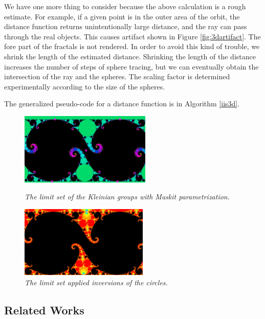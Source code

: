We have one more thing to consider because the above calculation is
a rough estimate.
For example, if a given point is in the outer area of the orbit, the
distance function returns unintentionally large distance, and the ray
can pass through the real objects. This causes artifact shown in Figure
\ref{fig:3dartifact}. The fore part of the fractals is not rendered.
In order to avoid this kind of trouble, we shrink the length of
the estimated distance.
Shrinking the length of the distance increases the number of steps of
sphere tracing, but we can
eventually obtain the intersection of the ray and the spheres.
The scaling factor is determined experimentally according to the size of
the spheres.

The generalized pseudo-code for a distance function is in Algorithm \ref{iis3d}. 

\begin{figure}[htbp]
 \begin{minipage}[t]{0.5\hsize}
  \center
  \includegraphics[height=1.35in, keepaspectratio]{img/preparation/related/josklein.png}
  \caption{\textit{The limit set of the Kleinian groups with Maskit parametrization.}}
  \label{fig:jos}
  \hspace*{\fill}
 \end{minipage}
 \begin{minipage}[t]{0.5\hsize}
  \center
  \includegraphics[height=1.35in, keepaspectratio]{img/preparation/related/joskleinInv.png}
  \caption{\textit{The limit set applied inversions of the circles.}}
  \label{fig:josInv}
  \hspace*{\fill}
 \end{minipage}
\end{figure}

\subsection{Related Works}

